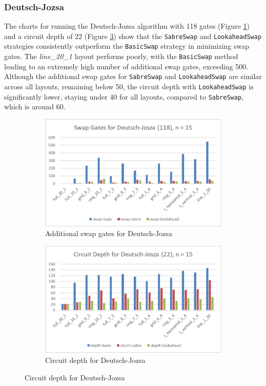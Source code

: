 \subsubsection{Deutsch-Jozsa} %
The charts for running the Deutsch-Jozsa algorithm with 118 gates (Figure \ref{fig:chart-dj}) and a circuit depth of 22 (Figure \ref{fig:chart-dj-depth}) show that the \lstinline{SabreSwap} and \lstinline{LookaheadSwap} strategies consistently outperform the \lstinline{BasicSwap} strategy in minimizing swap gates. The \textit{line\_20\_1} layout performs poorly, with the \lstinline{BasicSwap} method leading to an extremely high number of additional swap gates, exceeding 500. Although the additional swap gates for \lstinline{SabreSwap} and \lstinline{LookaheadSwap} are similar across all layouts, remaining below 50, the circuit depth with \lstinline{LookaheadSwap} is significantly lower, staying under 40 for all layouts, compared to \lstinline{SabreSwap}, which is around 60.
\begin{figure}[htb]
    \centering
    \begin{subfigure}{0.48\linewidth}
        \includegraphics[width=\linewidth]{image/chart_dj.png}
        \caption{Additional swap gates for Deutsch-Jozsa}
        \label{fig:chart-dj}
    \end{subfigure}
    \begin{subfigure}{0.48\linewidth}
        \includegraphics[width=\linewidth]{image/chart_dj_depth.png}
        \caption{Circuit depth for Deutsch-Jozsa}
        \label{fig:chart-dj-depth}
    \end{subfigure}
\end{figure}


